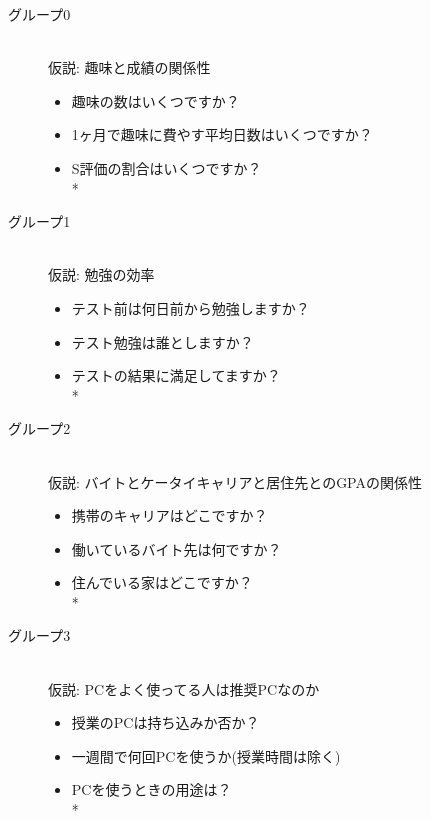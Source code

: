 \begin{description}
 \item[グループ0]\mbox{}\\ 
仮説: 趣味と成績の関係性
	\begin{itemize}
   	\item 趣味の数はいくつですか？
   	\item 1ヶ月で趣味に費やす平均日数はいくつですか？
   	\item S評価の割合はいくつですか？   \vspace{0.1in} \\*
	\end{itemize}
            
 \item[グループ1]\mbox{}\\
 仮説: 勉強の効率
	    \begin{itemize}
   	\item テスト前は何日前から勉強しますか？
   	\item テスト勉強は誰としますか？
   	\item テストの結果に満足してますか？   \vspace{0.1in} \\*
	\end{itemize}
	
	 \item[グループ2]\mbox{}\\
	 仮説: バイトとケータイキャリアと居住先とのGPAの関係性
	    \begin{itemize}
   	\item 携帯のキャリアはどこですか？
   	\item 働いているバイト先は何ですか？
   	\item 住んでいる家はどこですか？   \vspace{0.1in} \\*
	\end{itemize}

 \item[グループ3]\mbox{}\\
 仮説: PCをよく使ってる人は推奨PCなのか
	    \begin{itemize}
   	\item 授業のPCは持ち込みか否か？
   	\item 一週間で何回PCを使うか(授業時間は除く)
   	\item PCを使うときの用途は？   \vspace{0.1in} \\*
	\end{itemize}


\end{description}
